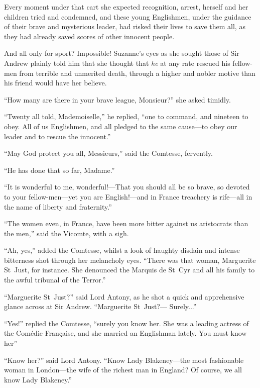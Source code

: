 Every moment under that cart she expected recognition, arrest, herself and her children tried and condemned, and these young Englishmen, under the guidance of their brave and mysterious leader, had risked their lives to save them all, as they had already saved scores of other innocent people.

And all only for sport? Impossible! Suzanne's eyes as she sought those of Sir Andrew plainly told him that she thought that \textit{he} at any rate rescued his fellow-men from terrible and unmerited death, through a higher and nobler motive than his friend would have her believe.

\enquote{How many are there in your brave league, Monsieur?} she asked timidly.

\enquote{Twenty all told, Mademoiselle,} he replied, \enquote{one to command, and nineteen to obey. All of us Englishmen, and all pledged to the same cause---to obey our leader and to rescue the innocent.}

\enquote{May God protect you all, Messieurs,} said the Comtesse, fervently.

\enquote{He has done that so far, Madame.}

\enquote{It is wonderful to me, wonderful!---That you should all be so brave, so devoted to your fellow-men---yet you are English!---and in France treachery is rife---all in the name of liberty and fraternity.}

\enquote{The women even, in France, have been more bitter against us aristocrats than the men,} said the Vicomte, with a sigh.

\enquote{Ah, yes,} added the Comtesse, whilst a look of haughty disdain and intense bitterness shot through her melancholy eyes. \enquote{There was that woman, Marguerite St~Just, for instance. She denounced the Marquis de St~Cyr and all his family to the awful tribunal of the Terror.}

\enquote{Marguerite St~Just?} said Lord Antony, as he shot a quick and apprehensive glance across at Sir Andrew. \enquote{Marguerite St~Just?--- Surely...}

\enquote{Yes!} replied the Comtesse, \enquote{surely you know her. She was a leading actress of the Comédie Française, and she married an Englishman lately. You must know her\longdash}

\enquote{Know her?} said Lord Antony. \enquote{Know Lady Blakeney---the most fashionable woman in London---the wife of the richest man in England? Of course, we all know Lady Blakeney.}

